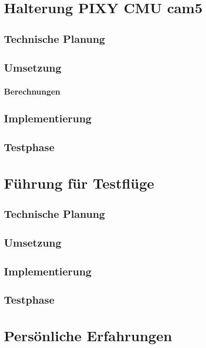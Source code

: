 \section{Halterung PIXY CMU cam5}

	\subsection{Technische Planung}

	\subsection{Umsetzung}

			\subsubsection{Berechnungen}

	\subsection{Implementierung}

	\subsection{Testphase}

\section{Führung für Testflüge}

	\subsection{Technische Planung}

	\subsection{Umsetzung}

	\subsection{Implementierung}

	\subsection{Testphase}

\section{Persönliche Erfahrungen}
